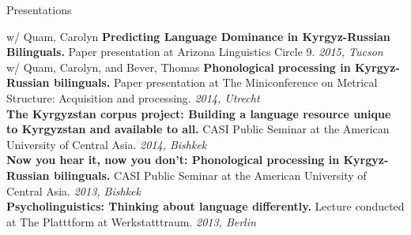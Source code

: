 \documentclass{resume} %
\begin{document}




\vspace{.25cm}

\begin{rSection}{Presentations}

{w/ Quam, Carolyn} {\bf Predicting Language Dominance in Kyrgyz-Russian Bilinguals.} {Paper presentation at Arizona Linguistics Circle 9.} \hfill {\em 2015, Tucson} \\

{w/ Quam, Carolyn, and Bever, Thomas} {\bf Phonological processing in Kyrgyz-Russian bilinguals.} {Paper presentation at The Miniconference on Metrical Structure: Acquisition and processing.} \hfill {\em 2014, Utrecht} \\

{\bf The Kyrgyzstan corpus project: Building a language resource unique to Kyrgyzstan and available to all.} {CASI Public Seminar at the American University of Central Asia.} \hfill {\em 2014, Bishkek} \\

{\bf Now you hear it, now you don’t: Phonological processing in Kyrgyz-Russian bilinguals.} {CASI Public Seminar at the American University of Central Asia.} \hfill {\em 2013, Bishkek} \\

{\bf Psycholinguistics: Thinking about language differently.} {Lecture conducted at The Platttform at Werkstatttraum.} \hfill {\em 2013, Berlin} \\


\end{rSection}




\vspace{.25cm}
\end{document}
